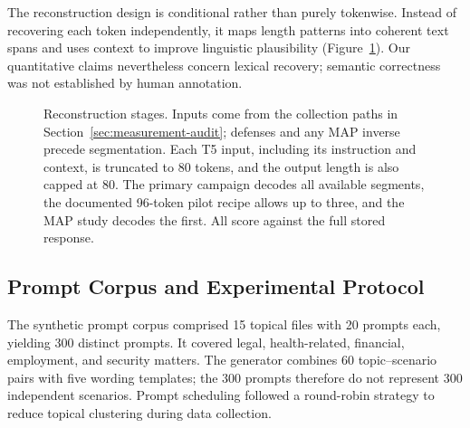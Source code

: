 \documentclass[electronics,article,submit,pdftex,moreauthors]{Definitions/mdpi}
\begin{document}
The reconstruction design is conditional rather than purely tokenwise. Instead of recovering each token independently, it maps length patterns into coherent text spans and uses context to improve linguistic plausibility (Figure~\ref{fig:pipeline}). Our quantitative claims nevertheless concern lexical recovery; semantic correctness was not established by human annotation.

\begin{figure}[ht]
\centering
{}
\caption{Reconstruction stages. Inputs come from the collection paths in Section~\ref{sec:measurement-audit}; defenses and any MAP inverse precede segmentation. Each T5 input, including its instruction and context, is truncated to 80 tokens, and the output length is also capped at 80. The primary campaign decodes all available segments, the documented 96-token pilot recipe allows up to three, and the MAP study decodes the first. All score against the full stored response.}
\label{fig:pipeline}
\end{figure}

\subsection{Prompt Corpus and Experimental Protocol}
The synthetic prompt corpus comprised 15 topical files with 20 prompts each, yielding 300 distinct prompts. It covered legal, health-related, financial, employment, and security matters. The generator combines 60 topic--scenario pairs with five wording templates; the 300 prompts therefore do not represent 300 independent scenarios. Prompt scheduling followed a round-robin strategy to reduce topical clustering during data collection.
\end{document}
